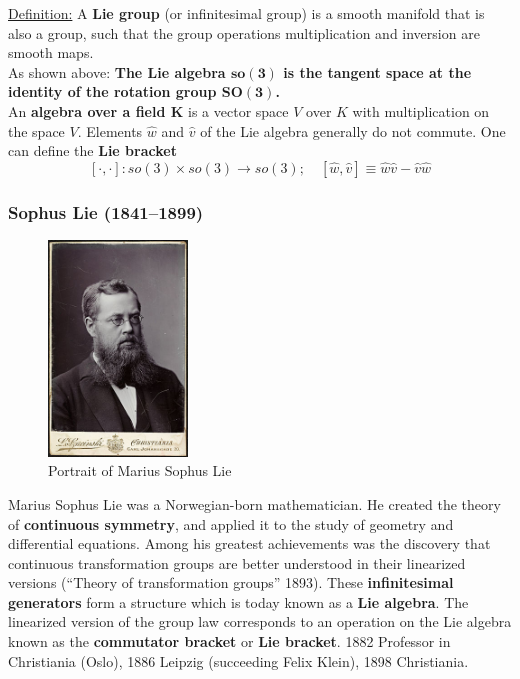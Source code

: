\underline{Definition:}
A \textbf{Lie group} (or infinitesimal group) is a smooth manifold that
is also a group, such that the group operations multiplication
and inversion are smooth maps.\\

As shown above: \textbf{The Lie algebra $\bm{so(3)}$ is the tangent space
at the identity of the rotation group $\bm{SO(3)}$.}\\

An \textbf{algebra over a field $\bm{K}$} is a vector space $V$ over $K$
with multiplication on the space $V$.
Elements $\widehat{w}$ and $\widehat{v}$ of the Lie algebra
generally do not commute.
One can define the \textbf{Lie bracket}
\[[\cdot,\cdot]: so(3) \times so(3) \rightarrow so(3);\quad
[\widehat{w},\widehat{v}] \equiv \widehat{w}\widehat{v} - \widehat{v}\widehat{w}\]


\subsubsection{Sophus Lie (1841--1899)}%
\label{ssub:sophus_lie_1841_1899_}

\begin{figure}[ht]
\centering
\includegraphics[width=10em]{assets/img/sophus_lie.jpg}
\caption*{Portrait of Marius Sophus Lie}
\end{figure}

Marius Sophus Lie was a Norwegian-born mathematician.
He created the theory of \textbf{continuous symmetry}, and applied it to
the study of geometry and differential equations. Among his greatest
achievements was the discovery that continuous transformation
groups are better understood in their linearized versions
(``Theory of transformation groups'' 1893).
These \textbf{infinitesimal generators} form a structure which is today
known as a \textbf{Lie algebra}. The linearized version of the group law
corresponds to an operation on the Lie algebra known as
the \textbf{commutator bracket} or \textbf{Lie bracket}.
1882 Professor in Christiania (Oslo),
1886 Leipzig (succeeding Felix Klein),
1898 Christiania.


